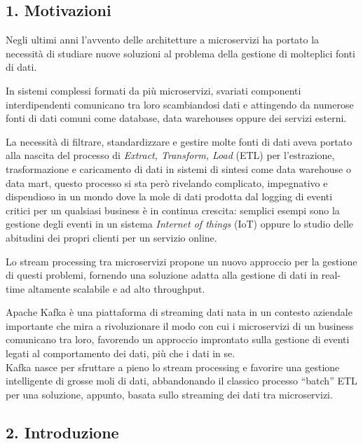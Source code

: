 \documentclass[]{article}
\begin{document}
\newpage

\hypertarget{motivazioni}{\subsection{1.
Motivazioni}\label{motivazioni}}

Negli ultimi anni l'avvento delle architetture a microservizi ha portato
la necessità di studiare nuove soluzioni al problema della gestione di
molteplici fonti di dati.

In sistemi complessi formati da più microservizi, svariati componenti
interdipendenti comunicano tra loro scambiandosi dati e attingendo da
numerose fonti di dati comuni come database, data warehouses oppure dei
servizi esterni.

La necessità di filtrare, standardizzare e gestire molte fonti di dati
aveva portato alla nascita del processo di \emph{Extract, Transform,
Load} (ETL) per l'estrazione, trasformazione e caricamento di dati in
sistemi di sintesi come data warehouse o data mart, questo processo si
sta però rivelando complicato, impegnativo e dispendioso in un mondo
dove la mole di dati prodotta dal logging di eventi critici per un
qualsiasi business è in continua crescita: semplici esempi sono la
gestione degli eventi in un sistema \emph{Internet of things} (IoT)
oppure lo studio delle abitudini dei propri clienti per un servizio
online.

Lo stream processing tra microservizi propone un nuovo approccio per la
gestione di questi problemi, fornendo una soluzione adatta alla gestione
di dati in real-time altamente scalabile e ad alto throughput.

Apache Kafka è una piattaforma di streaming dati nata in un contesto
aziendale importante che mira a rivoluzionare il modo con cui i
microservizi di un business comunicano tra loro, favorendo un approccio
improntato sulla gestione di eventi legati al comportamento dei dati,
più che i dati in se.\\
Kafka nasce per sfruttare a pieno lo stream processing e favorire una
gestione intelligente di grosse moli di dati, abbandonando il classico
processo ``batch'' ETL per una soluzione, appunto, basata sullo
streaming dei dati tra microservizi.

\newpage

\hypertarget{introduzione}{\subsection{2.
Introduzione}\label{introduzione}}
\end{document}
